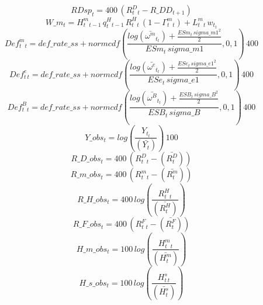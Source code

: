 \begin{dmath}
{RDsp_{t}}=400\, \left({  R^D_t _{t}}-{R\_DD_{t+1}}\right)
\end{dmath}
\begin{dmath}
{W\_m_{t}}={ H^m_t _{t-1}}\, { q^H_t  _{t-1}}\, {   R^H_t_{t}}\, \left(1-{ \Gamma^m_t _{t}}\right)+{ L^m_t _{t}}\, { w_t  _{t}}
\end{dmath}
\begin{dmath}
{ Def^m_t _{t}}={def\_rate\_ss}+normcdf(\frac{log\left({ \bar{\omega^m}_t _{t}}\right)+\frac{{ESm_{t}}\, {sigma\_m1}^{2}}{2}}{{ESm_{t}}\, {sigma\_m1}},0,1)\, 400
\end{dmath}
\begin{dmath}
{ Def^e_t _{t}}={def\_rate\_ss}+normcdf(\frac{log\left({ \bar{\omega^e}_t _{t}}\right)+\frac{{ESe_{t}}\, {sigma\_e1}^{2}}{2}}{{ESe_{t}}\, {sigma\_e1}},0,1)\, 400
\end{dmath}
\begin{dmath}
{ Def^B_t _{t}}={def\_rate\_ss}+normcdf(\frac{log\left({ \bar{\omega^B}_t _{t}}\right)+\frac{{ESB_{t}}\, {sigma\_B}^{2}}{2}}{{ESB_{t}}\, {sigma\_B}},0,1)\, 400
\end{dmath}
\begin{dmath}
{Y\_obs_{t}}=log\left(\frac{{ Y_t  _{t}}}{(\bar{ Y_t  })}\right)\, 100
\end{dmath}
\begin{dmath}
{R\_D\_obs_{t}}=400\, \left({  R^D_t _{t}}-(\bar{  R^D_t })\right)
\end{dmath}
\begin{dmath}
{R\_m\_obs_{t}}=400\, \left({  R^m_t _{t}}-(\bar{  R^m_t })\right)
\end{dmath}
\begin{dmath}
{R\_H\_obs_{t}}=400\, log\left(\frac{{   R^H_t_{t}}}{(\bar{   R^H_t})}\right)
\end{dmath}
\begin{dmath}
{R\_F\_obs_{t}}=400\, \left({ R^F_t  _{t}}-(\bar{ R^F_t  })\right)
\end{dmath}
\begin{dmath}
{H\_m\_obs_{t}}=100\, log\left(\frac{{ H^m_t _{t}}}{(\bar{ H^m_t })}\right)
\end{dmath}
\begin{dmath}
{H\_s\_obs_{t}}=100\, log\left(\frac{{ H^s_t _{t}}}{(\bar{ H^s_t })}\right)
\end{dmath}
